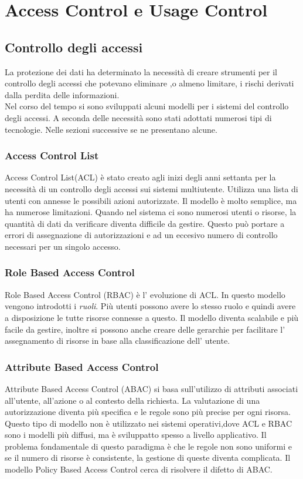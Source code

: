 \chapter{Access Control e Usage Control}
\label{chap:Access Control e Usage Control}
\section{Controllo degli accessi}
\label{sec:Controllo degli accessi}
La protezione dei dati ha determinato la necessità di creare strumenti per il controllo degli accessi che potevano eliminare
,o almeno limitare, i rischi derivati dalla perdita delle informazioni.\\
Nel corso del tempo si sono sviluppati alcuni modelli per i sistemi del controllo degli accessi. A seconda delle necessità
sono stati adottati numerosi tipi di tecnologie\cite{NISTACM}. Nelle sezioni successive se ne presentano alcune.
\subsection{Access Control List}
\label{sub:ACL}
Access Control List(ACL) è stato creato agli inizi degli anni settanta per la necessità di un controllo degli
accessi sui sistemi multiutente.
Utilizza una lista di utenti con annesse le possibili azioni autorizzate. Il modello è molto semplice,
ma ha numerose limitazioni. Quando nel sistema ci sono numerosi utenti o risorse, la quantità di dati da verificare diventa
difficile da gestire. Questo può portare a errori di assegnazione di autorizzazioni e ad un eccesivo numero di controllo
necessari per un singolo accesso.
\subsection{Role Based Access Control}
\label{sub:RBAC}
Role Based Access Control (RBAC) è l' evoluzione di ACL. In questo modello vengono introdotti i \emph{ruoli}. Più utenti
possono avere lo stesso ruolo e quindi avere a disposizione le tutte risorse connesse a questo. Il modello
diventa scalabile e più facile da gestire, inoltre si possono anche creare delle gerarchie per facilitare l' assegnamento di
risorse in base alla classificazione dell' utente.
\subsection{Attribute Based Access Control}
\label{sub:ABAC}
Attribute Based Access Control (ABAC) si basa sull'utilizzo di attributi associati all'utente, all'azione o al contesto
della richiesta. La valutazione di una autorizzazione diventa più specifica e le regole sono più precise per ogni risorsa.
Questo tipo di modello non è utilizzato nei sistemi operativi,dove ACL e RBAC sono i modelli più diffusi, ma è sviluppatto
spesso a livello applicativo. Il problema fondamentale di questo paradigma è che le regole non sono uniformi e se il numero
di risorse è consistente, la gestione di queste diventa complicata. Il modello Policy Based Access Control cerca di
risolvere il difetto di ABAC.
